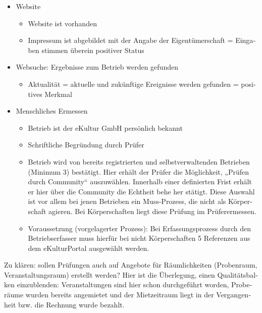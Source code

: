 \begin{otherlanguage}{german}
\begin{itemize}
\begin{itemize}
\begin{itemize}
		\end{itemize}
	\item Website
	\begin{itemize}
		\item Website ist vorhanden
		\item Impressum ist abgebildet mit der Angabe der Eigentümerschaft = Eingaben stimmen überein  positiver Status
	\end{itemize}
	\item Websuche: Ergebnisse zum Betrieb werden gefunden 
		\begin{itemize}
		\item Aktualität = aktuelle und zukünftige Ereignisse werden gefunden = positives Merkmal
		\end{itemize}
	\item Menschliches Ermessen
		\begin{itemize}
		\item Betrieb ist der eKultur GmbH persönlich bekannt
		\item Schriftliche Begründung durch Prüfer
		\item Betrieb wird von bereits registrierten und selbstverwaltenden Betrieben (Minimum 3) bestätigt. Hier erhält der Prüfer die Möglich\-keit, „Prüfen durch Community“ auszuwählen. Innerhalb einer definierten Frist erhält er hier über die Community die Echtheit be\-he her stätigt. Diese Auswahl ist vor allem bei jenen Betrieben ein Muss-Prozess, die nicht als Körperschaft agieren. Bei Körperschaften liegt diese Prüfung im Prüferermessen.
		\item Voraussetzung (vorgelagerter Prozess): Bei Erfassungsprozess durch den Betriebserfasser muss hierfür bei nicht Körperschaften 5 Referenzen aus dem eKulturPortal ausgewählt werden.
		\end{itemize}
	\end{itemize}
\end{itemize}

Zu klären: sollen Prüfungen auch auf Angebote für Räumlichkeiten (Probenraum, Veranstaltungsraum) erstellt werden? Hier ist die Überlegung, einen Qualitätsbalken einzublenden: Veranstaltungen sind hier schon durchgeführt worden, Proberäume wurden bereits angemietet und der Mietzeitraum liegt in der Vergangenheit bzw. die Rechnung wurde bezahlt.
\end{otherlanguage}
